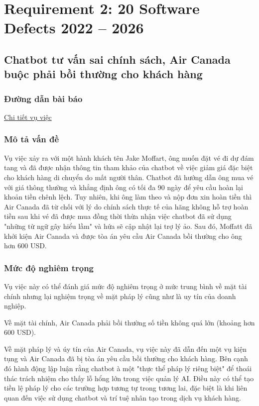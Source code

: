 ﻿\section{Requirement 2: 20 Software Defects 2022 – 2026}

\subsection{Chatbot tư vấn sai chính sách, Air Canada buộc phải bồi thường cho khách hàng}

\subsubsection{Đường dẫn bài báo}
\href{https://znews.vn/chatbot-hua-leo-hang-hang-khong-phai-boi-thuong-cho-khach-post1460716.html}{Chi tiết vụ việc}

\subsubsection{Mô tả vấn đề}
Vụ việc xảy ra với một hành khách tên Jake Moffart, ông muốn đặt vé đi dự đám tang và đã được nhận thông tin tham khảo của chatbot về việc giảm giá đặc biệt cho khách hàng di chuyển do mất người thân. Chatbot đã hướng dẫn ông mua vé với giá thông thường và khẳng định ông có tối đa 90 ngày để yêu cầu hoàn lại khoản tiền chênh lệch. Tuy nhiên, khi ông làm theo và nộp đơn xin hoàn tiền thì Air Canada đã từ chối với lý do chính sách thực tế của hãng không hỗ trợ hoàn tiền sau khi vé đã được mua đồng thời thừa nhận việc chatbot đã sử dụng "những từ ngữ gây hiểu lầm" và hứa sẽ cập nhật lại trợ lý ảo. Sau đó, Moffatt đã khởi kiện Air Canada và được tòa án yêu cầu Air Canada bồi thường cho ông hơn 600 USD.

\subsubsection{Mức độ nghiêm trọng}
Vụ việc này có thể đánh giá mức độ nghiêm trọng ở mức trung bình về mặt tài chính nhưng lại nghiệm trọng về mặt pháp lý cũng như là uy tín của doanh nghiệp.

Về mặt tài chính, Air Canada phải bồi thường số tiền không quá lớn (khoảng hơn 600 USD).

Về mặt pháp lý và úy tín của Air Canada, vụ việc này đã dẫn đến một vụ kiện tụng và Air Canada đã bị tòa án yêu cầu bồi thường cho khách hàng. Bên cạnh đó hành động lập luận rằng chatbot à một "thực thể pháp lý riêng biệt" để thoái thác trách nhiệm cho thấy lỗ hổng lớn trong việc quản lý AI. Điều này có thể tạo tiền lệ pháp lý cho các trường hợp tương tự trong tương lai, đặc biệt là khi liên quan đến việc sử dụng chatbot và trí tuệ nhân tạo trong dịch vụ khách hàng.

